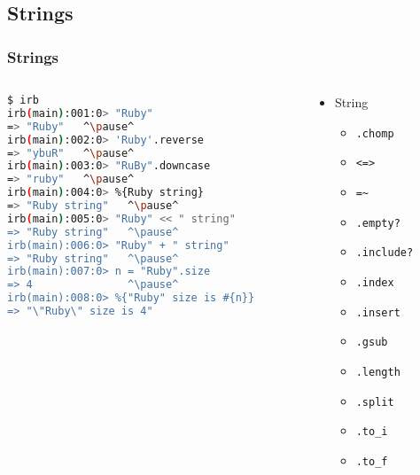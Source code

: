 \subsection{Strings}
\begin{frame}[fragile]\frametitle{Strings}

\begin{columns}[c] 

\begin{column}{7.5cm}
\begin{lstlisting}[language=bash, escapechar={^}]
$ irb
irb(main):001:0> "Ruby"
=> "Ruby"   ^\pause^
irb(main):002:0> 'Ruby'.reverse
=> "ybuR"   ^\pause^
irb(main):003:0> "RuBy".downcase
=> "ruby"   ^\pause^
irb(main):004:0> %{Ruby string}
=> "Ruby string"   ^\pause^
irb(main):005:0> "Ruby" << " string"
=> "Ruby string"   ^\pause^
irb(main):006:0> "Ruby" + " string"
=> "Ruby string"   ^\pause^
irb(main):007:0> n = "Ruby".size
=> 4               ^\pause^
irb(main):008:0> %{"Ruby" size is #{n}}
=> "\"Ruby\" size is 4"
\end{lstlisting}
\end{column}

\pause

\begin{column}{4cm}
\begin{itemize}

\item String
\begin{itemize}
\item \texttt{.chomp}
\item \texttt{<=>}
\item \texttt{=\~}
\item \texttt{.empty?}
\item \texttt{.include?}
\item \texttt{.index}
\item \texttt{.insert}
\item \texttt{.gsub}
\item \texttt{.length}
\item \texttt{.split}
\item \texttt{.to\_i}
\item \texttt{.to\_f}
\end{itemize}

\end{itemize}
\end{column}

\end{columns}

\end{frame}






